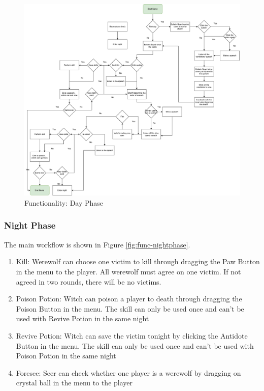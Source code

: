 \documentclass[11pt]{article}
\begin{document}
\begin{figure}
\centering
\includegraphics[width=0.9\linewidth, keepaspectratio]{func-dayphase.pdf}
\caption{Functionality: Day Phase}
\label{fig:func-dayphase}
\end{figure}

\subsubsection{Night Phase}
The main workflow is shown in Figure \ref{fig:func-nightphase}.

\begin{enumerate}
\item
Kill: Werewolf can choose one victim to kill through dragging the Paw Button in the menu to the player. All werewolf must agree on one victim. If not agreed in two rounds, there will be no victims.

\item
Poison Potion: Witch can poison a player to death through dragging the Poison Button in the menu. The skill can only be used once and can't be used with Revive Potion in the same night

\item
Revive Potion: Witch can save the victim tonight by clicking the Antidote Button in the menu. The skill can only be used once and can't be used with Poison Potion in the same night

\item
Foresee: Seer can check whether one player is a werewolf by dragging on crystal ball in the menu to the player
\end{enumerate}
\end{document}
